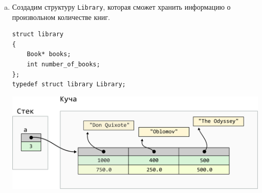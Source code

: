 \documentclass[10pt]{article}
\newcommand{\mallocImagesScale}{0.72}
\begin{document}
\begin{enumerate}[a.]

\item Создадим структуру \texttt{Library}, которая сможет хранить информацию о произвольном количестве книг.
\begin{lstlisting}
struct library 
{
    Book* books;
    int number_of_books;
};
typedef struct library Library;
\end{lstlisting}

\begin{center}
\includegraphics[scale=\mallocImagesScale]{../images/malloc_homework/09stack_struct_book_library.png}
\end{center}


\end{enumerate}
\end{document}
